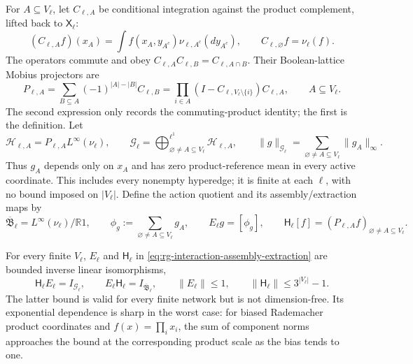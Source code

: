 For \(A\subseteq V_\ell\), let \(C_{\ell,A}\) be conditional integration
against the product complement, lifted back to \(\mathsf X_\ell\):
\begin{equation}
 (C_{\ell,A}f)(x_A)
 =\int f(x_A,y_{A^c}) \nu_{\ell,A^c}(dy_{A^c}),
 \qquad C_{\ell,\varnothing}f=\nu_\ell(f).
 \label{eq:rg-coordinate-expectation}
\end{equation}
The operators commute and obey
\(C_{\ell,A}C_{\ell,B}=C_{\ell,A\cap B}\).  Their Boolean-lattice
Mobius projectors are
\begin{equation}
 P_{\ell,A}
 =\sum_{B\subseteq A}(-1)^{|A|-|B|}C_{\ell,B}
 =\prod_{i\in A}(I-C_{\ell,V_\ell\setminus\{i\}})
 C_{\ell,A},
 \qquad A\subseteq V_\ell.
 \label{eq:rg-hoeffding-mobius-projectors}
\end{equation}
The second expression only records the commuting-product identity; the
first is the definition.  Let
\begin{equation}
 \mathcal H_{\ell,A}=P_{\ell,A}L^\infty(\nu_\ell),\qquad
 \mathcal G_\ell=
 \bigoplus_{\varnothing\ne A\subseteq V_\ell}^{\ell^1}
 \mathcal H_{\ell,A},\qquad
 \lVert g\rVert_{\mathcal G_\ell}
 =\sum_{\varnothing\ne A\subseteq V_\ell}\lVert g_A\rVert_\infty.
 \label{eq:rg-full-interaction-banach-space}
\end{equation}
Thus \(g_A\) depends only on \(x_A\) and has zero product-reference mean
in every active coordinate.  This includes every nonempty hyperedge; it is
finite at each \(\ell\), with no bound imposed on \(\lvert V_\ell\rvert\).
Define the action quotient and its assembly/extraction maps by
\begin{equation}
 \overline{\mathfrak B}_\ell=L^\infty(\nu_\ell)/\mathbb R1,\qquad
 \phi_g:=\sum_{\varnothing\ne A\subseteq V_\ell}g_A,\qquad
 E_\ell g=[\phi_g],\qquad
 \mathsf H_\ell[f]=(P_{\ell,A}f)_{\varnothing\ne A\subseteq V_\ell}.
 \label{eq:rg-interaction-assembly-extraction}
\end{equation}

For every finite \(V_\ell\), \(E_\ell\) and \(\mathsf H_\ell\) in
\eqref{eq:rg-interaction-assembly-extraction} are bounded inverse linear
isomorphisms,
\begin{equation}
 \mathsf H_\ell E_\ell=I_{\mathcal G_\ell},\qquad
 E_\ell\mathsf H_\ell=I_{\overline{\mathfrak B}_\ell},\qquad
 \lVert E_\ell\rVert\leq1,\qquad
 \lVert\mathsf H_\ell\rVert\leq3^{|V_\ell|}-1.
 \label{eq:rg-hoeffding-inverse-and-bounds}
\end{equation}
The latter bound is valid for every finite network but is not dimension-free.
Its exponential dependence is sharp in the worst case: for biased Rademacher
product coordinates and \(f(x)=\prod_i x_i\), the sum of component norms
approaches the bound at the corresponding product scale as the bias tends to
one. 

